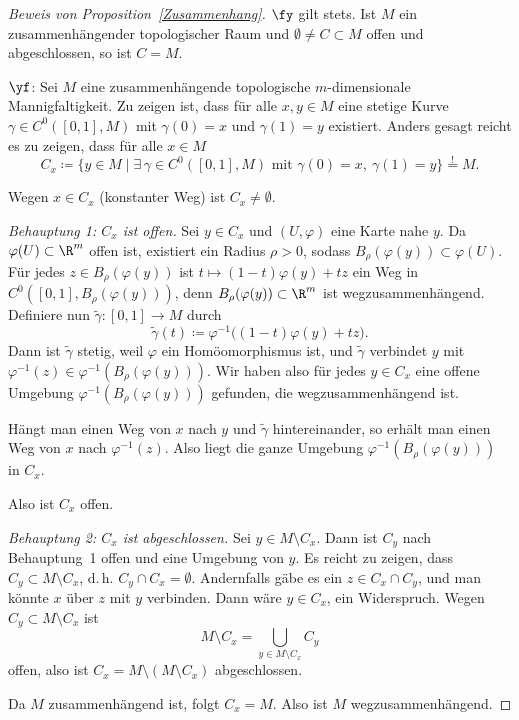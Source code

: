 \documentclass[11pt]{article}
\begin{document}
\begin{proof}[Beweis von Proposition~\ref{Zusammenhang}]
  \glqq$\fy$\grqq{} gilt stets. Ist $M$ ein zusammenhängender topologischer Raum und $\emptyset \neq C \subset M$ offen und abgeschlossen, so ist $C = M$.

  \glqq$\yf$\grqq: Sei $M$ eine zusammenhängende topologische $m$-dimensionale Mannigfaltigkeit. Zu zeigen ist, dass für alle $x, y \in M$ eine stetige Kurve $\gamma \in C^0([0, 1], M)$ mit $\gamma(0) = x$ und $\gamma(1) = y$ existiert. Anders gesagt reicht es zu zeigen, dass für alle $x \in M$
  \[ C_x \coloneqq \{ y \in M \mid \exists\, \gamma \in C^0([0, 1], M) \text{ mit } \gamma(0) = x,\ \gamma(1) = y \} \overset{!}{=} M. \]
\begin{ergaenzung}
  Wegen $x \in C_x$ (konstanter Weg) ist $C_x \neq \emptyset$.
  \end{ergaenzung}

  \textit{Behauptung 1: $C_x$ ist offen.} Sei $y \in C_x$ und $(U, \varphi)$ eine Karte nahe $y$. Da $\varphi(U) \subset \R^m$ offen ist, existiert ein Radius $\rho > 0$, sodass $B_\rho(\varphi(y)) \subset \varphi(U)$. Für jedes $z \in B_\rho(\varphi(y))$ ist $t \mapsto (1 - t)\varphi(y) + tz$ ein Weg in $C^0([0, 1], B_\rho(\varphi(y)))$, denn $B_\rho(\varphi(y)) \subset \R^m$ ist wegzusammenhängend. Definiere nun $\tilde{\gamma}\colon [0, 1] \to M$ durch
  \[ \tilde{\gamma}(t) \coloneqq \varphi^{-1}\bigl((1 - t)\varphi(y) + tz\bigr). \]
  Dann ist $\tilde{\gamma}$ stetig, weil $\varphi$ ein Homöomorphismus ist, und $\tilde{\gamma}$ verbindet $y$ mit $\varphi^{-1}(z) \in \varphi^{-1}(B_\rho(\varphi(y)))$. Wir haben also für jedes $y \in C_x$ eine offene Umgebung $\varphi^{-1}(B_\rho(\varphi(y)))$ gefunden, die wegzusammenhängend ist.
\begin{ergaenzung}
  Hängt man einen Weg von $x$ nach $y$ und $\tilde{\gamma}$ hintereinander, so erhält man einen Weg von $x$ nach $\varphi^{-1}(z)$. Also liegt die ganze Umgebung $\varphi^{-1}(B_\rho(\varphi(y)))$ in $C_x$.
  \end{ergaenzung}
  Also ist $C_x$ offen.


  \textit{Behauptung 2: $C_x$ ist abgeschlossen.} Sei $y \in M \setminus C_x$. Dann ist $C_y$ nach Behauptung~1 offen und eine Umgebung von $y$. Es reicht zu zeigen, dass $C_y \subset M \setminus C_x$, d.\,h. $C_y \cap C_x = \emptyset$. Andernfalls gäbe es ein $z \in C_x \cap C_y$, und man könnte $x$ über $z$ mit $y$ verbinden. Dann wäre $y \in C_x$, ein Widerspruch. Wegen $C_y \subset M \setminus C_x$ ist
  \[ M \setminus C_x = \bigcup_{y \in M \setminus C_x} C_y \]
  offen, also ist $C_x = M \setminus (M \setminus C_x)$ abgeschlossen.


  Da $M$ zusammenhängend ist, folgt $C_x = M$. Also ist $M$ wegzusammenhängend.
\end{proof}
\end{document}
